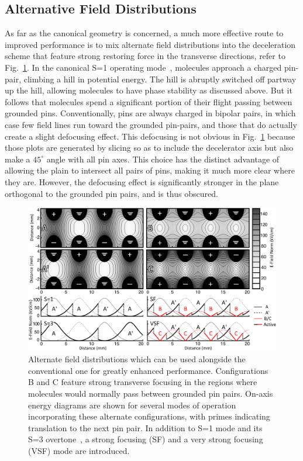 \subsection{Alternative Field Distributions}\label{sec:afd}

As far as the canonical geometry is concerned, a much more effective route to improved performance is to mix alternate field distributions into the deceleration scheme that feature strong restoring force in the transverse directions, refer to Fig.~\ref{fig:chargecartoon}.
In the canonical S=1 operating mode~\cite{VanDeMeerakker2012}, molecules approach a charged pin-pair, climbing a hill in potential energy. 
The hill is abruptly switched off partway up the hill, allowing molecules to have phase stability as discussed above.
But it follows that molecules spend a significant portion of their flight passing between grounded pins.
Conventionally, pins are always charged in bipolar pairs, in which case few field lines run toward the grounded pin-pairs, and those that do actually create a slight defocusing effect.
This defocusing is not obvious in Fig.~\ref{fig:chargecartoon} because those plots are generated by slicing so as to include the decelerator axis but also make a $45^\circ$ angle with all pin axes.
This choice has the distinct advantage of allowing the plain to intersect all pairs of pins, making it much more clear where they are.
However, the defocusing effect is significantly stronger in the plane orthogonal to the grounded pin pairs, and is thus obscured.

\begin{figure}[t!]
\includegraphics[width=\linewidth]{Slowing/pinpairformal.png}%
\caption[Definition and Explanation of Alternate Field Distributions]{\label{fig:chargecartoon}
Alternate field distributions which can be used alongside the conventional one for greatly enhanced performance. Configurations B and C feature strong transverse focusing in the regions where molecules would normally pass between grounded pin pairs. On-axis energy diagrams are shown for several modes of operation incorporating these alternate configurations, with primes indicating translation to the next pin pair. In addition to S=1 mode and its S=3 overtone~\cite{VanDeMeerakker2005a}, a strong focusing (SF) and a very strong focusing (VSF) mode are introduced.
}
\end{figure}


